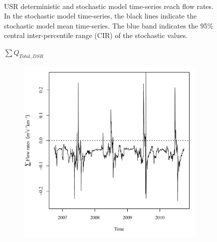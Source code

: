 \begin{linenumbers}
\begin{landscape}
\begin{figure}
\begin{subfigure}{0.7\textwidth}
		\end{subfigure}\\
		\caption[USR deterministic and stochastic model time-series reach flow rates.]{USR deterministic and stochastic model time-series reach flow rates.  In the stochastic model time-series, the black lines indicate the stochastic model mean time-series.  The blue band indicates the 95\% central inter-percentile range (CIR) of the stochastic values.}
		\label{fig:reachFlow_US}
	\end{figure}
\end{landscape}
\subfiguretop
\begin{landscape}
	\begin{figure}
		\centering
		$ \displaystyle \sum Q_{Total,DSR} $
		\begin{subfigure}{0.7\textwidth}
			\centering
			\includegraphics[width=\tableCustomSize]{"Figures/Results_DSR/Deterministic/Balance Water - flow"}
		\end{subfigure}%
		\begin{subfigure}{0.7\textwidth}
			\centering

\end{subfigure}
\end{figure}
\end{landscape}
\end{linenumbers}
